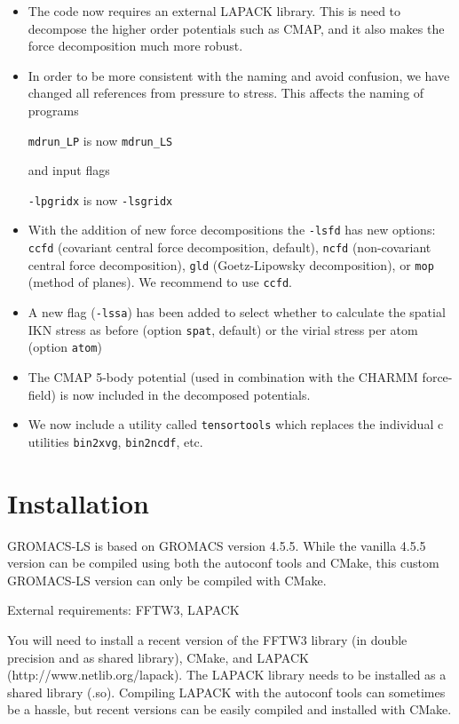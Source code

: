 \documentclass[10pt,letterpaper,notitlepage]{article}
\begin{document}
\begin{itemize}
	\item The code now requires an external LAPACK library. This is need to decompose the higher order potentials such as CMAP, and it also makes the force decomposition much more robust.
	\item In order to be more consistent with the naming and avoid confusion, we have changed all references from pressure to stress. This affects the naming of programs
	
	\texttt{mdrun\_LP} is now \texttt{mdrun\_LS}
	
	and input flags
	
	\texttt{-lpgridx} is now \texttt{-lsgridx}
	
	\item With the addition of new force decompositions the \texttt{-lsfd} has new options: \texttt{ccfd} (covariant central force decomposition, default), \texttt{ncfd} (non-covariant central force decomposition), \texttt{gld} (Goetz-Lipowsky decomposition), or \texttt{mop} (method of planes). We recommend to use \texttt{ccfd}.
	\item A new flag (\texttt{-lssa}) has been added to select whether to calculate the spatial IKN stress as before (option \texttt{spat}, default) or the virial stress per atom (option \texttt{atom})
	\item The CMAP 5-body potential (used in combination with the CHARMM force-field) is now included in the decomposed potentials.
	\item We now include a utility called \texttt{tensortools} which replaces the individual c utilities \texttt{bin2xvg}, \texttt{bin2ncdf}, etc.
\end{itemize}

\section{Installation}
GROMACS-LS is based on GROMACS version 4.5.5. While the vanilla 4.5.5 version can be compiled using both the autoconf tools and CMake, this custom GROMACS-LS version can only be compiled with CMake.

External requirements: FFTW3, LAPACK

You will need to install a recent version of the FFTW3 library (in double precision and as shared library), CMake, and LAPACK (http://www.netlib.org/lapack). The LAPACK library needs to be installed as a shared library (.so). Compiling LAPACK with the autoconf tools can sometimes be a hassle, but recent versions can be easily compiled and installed with CMake.
\end{document}
